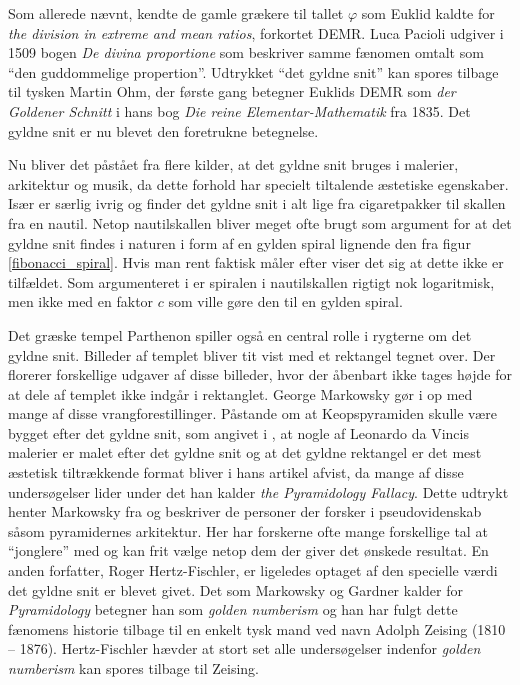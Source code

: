 {
Som allerede nævnt, kendte de gamle grækere til tallet $\varphi$ som
Euklid kaldte for \emph{the division in extreme and mean ratios},
forkortet DEMR. Luca Pacioli udgiver i 1509 bogen \emph{De divina
proportione} som beskriver samme fænomen omtalt som ``den guddommelige
propertion''. Udtrykket ``det gyldne snit'' kan spores tilbage til
tysken Martin Ohm, der første gang betegner Euklids DEMR som \emph{der
Goldener Schnitt} i hans bog \emph{Die reine Elementar-Mathematik} fra
1835\cite{Markowsky1992}. Det gyldne snit er nu blevet den foretrukne
betegnelse.

Nu bliver det påstået fra flere kilder, at det gyldne snit bruges i
malerier, arkitektur og musik, da dette forhold har specielt tiltalende
æstetiske
egenskaber\cite{GoldenNumber}\cite{RatioArt}\cite{Putz1995}\cite{Stakhov2006490}\cite{Boussora2004}.
Især \cite{GoldenNumber} er særlig ivrig og finder det gyldne snit i alt
lige fra cigaretpakker til skallen fra en nautil. Netop nautilskallen
bliver meget ofte brugt som argument for at det gyldne snit findes i
naturen i form af en gylden spiral lignende den fra figur
\ref{fibonacci_spiral}. Hvis man rent faktisk måler efter
viser det sig at dette ikke er tilfældet. Som argumenteret i
\cite{Sharp2002} er spiralen i nautilskallen rigtigt nok logaritmisk,
men ikke med en faktor $c$ som ville gøre den til en gylden spiral.

Det græske tempel Parthenon spiller også en central rolle i rygterne om
det gyldne snit. Billeder af templet bliver tit vist med et rektangel
tegnet over. Der florerer forskellige udgaver af disse billeder, hvor
der åbenbart ikke tages højde for at dele af templet ikke indgår i
rektanglet. George Markowsky gør i \cite{Markowsky1992} op med mange af
disse vrangforestillinger. Påstande om at Keopspyramiden skulle være
bygget efter det gyldne snit, som angivet i \cite{Stakhov2006490}, at
nogle af Leonardo da Vincis malerier er malet efter det gyldne snit og
at det gyldne rektangel er det mest æstetisk tiltrækkende
format\cite{GoldenNumber}\cite{RatioArt} bliver i hans artikel afvist,
da mange af disse undersøgelser lider under det han kalder \emph{the
Pyramidology Fallacy}. Dette udtrykt henter Markowsky fra
\cite{Gardner1952_2} og beskriver de personer der forsker i
pseudovidenskab såsom pyramidernes arkitektur. Her har forskerne ofte
mange forskellige tal at ``jonglere'' med og kan frit vælge netop dem
der giver det ønskede resultat. En anden forfatter, Roger
Hertz-Fischler, er ligeledes optaget af den specielle værdi det gyldne
snit er blevet givet. Det som Markowsky og Gardner kalder for
\emph{Pyramidology} betegner han som \emph{golden numberism} og han har
fulgt dette fænomens historie tilbage til en enkelt tysk mand ved navn
Adolph Zeising (1810 -- 1876)\cite{Herz-Fischler2005}. Hertz-Fischler hævder at stort
set alle undersøgelser indenfor \emph{golden numberism} kan spores
tilbage til Zeising.

}
